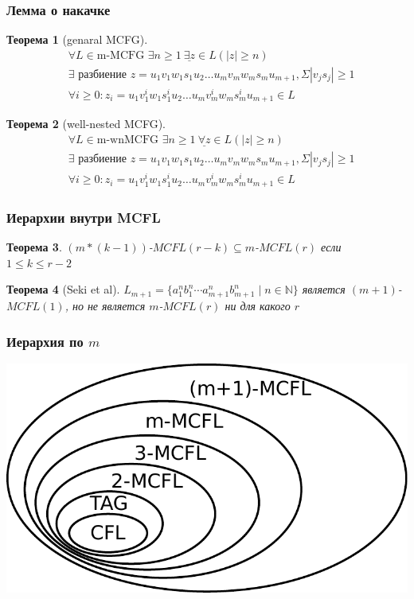 \documentclass{beamer}
\newtheorem{rutheorem}{Теорема}
\begin{document}
\begin{frame}[fragile]

  \frametitle{Лемма о накачке}
  \begin{rutheorem}[genaral MCFG]
    \begin{align*}
    &\forall L \in \text{m-MCFG } \exists n \geq 1 \ \underline{\boldsymbol{\exists} z} \in L (|z| \geq n)  \\
    &\exists \text{ разбиение } z=u_1 v_1 w_1 s_1 u_2 \ldots u_m v_m w_m s_m u_{m+1}, \Sigma|v_js_j| \geq 1 \\
    &\forall i \geq 0: z_i = u_1 v_1^i w_1 s_1^i u_2 \ldots u_m v_m^i w_m s_m^i u_{m+1} \in L
    \end{align*}
  \end{rutheorem}
\pause
  \begin{rutheorem}[well-nested MCFG]
    \begin{align*}
    &\forall L \in \text{m-wnMCFG } \exists n \geq 1 \ \underline{\boldsymbol{\forall} z} \in L (|z| \geq n)  \\
    &\exists \text{ разбиение } z=u_1 v_1 w_1 s_1 u_2 \ldots u_m v_m w_m s_m u_{m+1}, \Sigma|v_js_j| \geq 1 \\
    &\forall i \geq 0: z_i = u_1 v_1^i w_1 s_1^i u_2 \ldots u_m v_m^i w_m s_m^i u_{m+1} \in L
    \end{align*}
  \end{rutheorem}
\end{frame}

\begin{frame}[fragile]

  \frametitle{Иерархии внутри MCFL}
  \begin{rutheorem}
  $(m*(k-1))$-$MCFL(r-k) \subseteq m$-$MCFL(r) $ если $1 \leq k \leq r - 2$
  \end{rutheorem}
  \pause
  \begin{rutheorem}[Seki et al]
  $L_{m+1} = \{a_1^nb_1^n\cdots a_{m+1}^n b_{m+1}^n \mid n\in \mathbb{N}\}$ является $(m+1)$-$MCFL(1)$, но не является $m$-$MCFL(r)$ ни для какого $r$
  \end{rutheorem}


\end{frame}


\begin{frame}[fragile]

  \frametitle{Иерархия по $m$}

\includegraphics[width=\textwidth]{pics/mcfg.pdf}
\end{frame}
\end{document}
